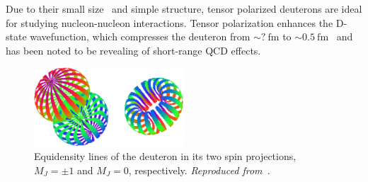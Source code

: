 Due to their small size~\cite{needed} and simple structure, tensor polarized deuterons are ideal for studying nucleon-nucleon interactions. Tensor polarization enhances the D-state wavefunction, which compresses the deuteron from $\sim?\mathrm{~fm}$ to $\sim0.5\mathrm{~fm}$~\cite{Forest:1996kp} and has been noted to be revealing of short-range QCD effects.

\begin{figure}
\centering
\includegraphics[width=0.5\textwidth]{figs/deuteron_states.eps}
\caption{\label{fig:deuteron}
Equidensity lines of the deuteron in its two spin projections, $M_J=\pm 1$ and $M_J=0$, respectively.
{\it Reproduced from~\cite{Carlson:1997qn,Forest:1996kp}}.
}
\end{figure}

